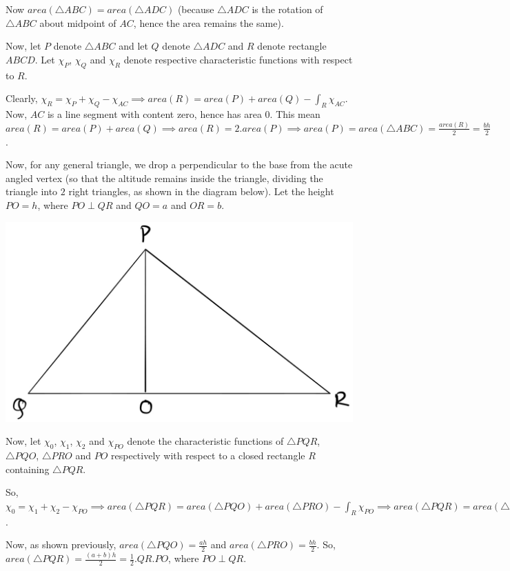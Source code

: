 \documentclass[11pt]{amsart}
\theoremstyle{definition}
\begin{document}
\begin{enumerate}[wide, labelwidth=!, labelindent=0pt]
Now $area(\triangle ABC) = area(\triangle ADC)$ (because $\triangle ADC$ is the rotation of $\triangle ABC$ about midpoint of $AC$, hence the area remains the same).

Now, let $P$ denote $\triangle ABC$ and let $Q$ denote $\triangle ADC$ and $R$ denote rectangle $ABCD$. Let $\chi_P$, $\chi_Q$ and $\chi_R$ denote respective characteristic functions with respect to $R$.

Clearly, $\chi_R = \chi_P + \chi_Q - \chi_{AC} \implies area(R) = area(P) + area(Q) - \int_{R} \chi_{AC}$. Now, $AC$ is a line segment with content zero, hence has area $0$. This mean $area(R) = area(P) + area(Q) \implies area(R) = 2.area(P) \implies area(P) = area(\triangle ABC) = \frac{area(R)}{2} = \frac{bh}{2}$.

Now, for any general triangle, we drop a perpendicular to the base from the acute angled vertex (so that the altitude remains inside the triangle, dividing the triangle into $2$ right triangles, as shown in the diagram below). Let the height $PO = h$, where $PO \perp QR$ and $QO = a$ and $OR = b$. 
\begin{center}
\includegraphics[scale = 0.12]{images/tri.jpeg}   
\end{center}
Now, let $\chi_0$, $\chi_1$, $\chi_2$ and $\chi_{PO}$ denote the characteristic functions of $\triangle PQR$, $\triangle PQO$, $\triangle PRO$ and $PO$ respectively with respect to a closed rectangle $R$ containing $\triangle PQR$.

So, $\chi_0 = \chi_1 + \chi_2 - \chi_{PO} \implies area(\triangle PQR)= area(\triangle PQO) + area(\triangle PRO) - \int_R \chi_{PO} \implies area(\triangle PQR)= area(\triangle PQO) + area(\triangle PRO)$.

Now, as shown previously, $area(\triangle PQO) = \frac{ah}{2}$ and $area(\triangle PRO) = \frac{bh}{2}$. So, $area(\triangle PQR) = \frac{(a+b)h}{2} = \frac{1}{2}.QR.PO$, where $PO \perp QR$.


\end{enumerate}
\end{document}

